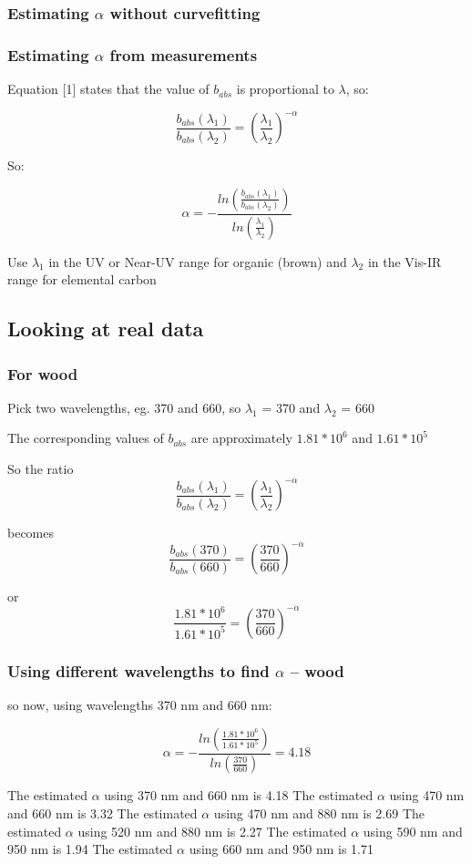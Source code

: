 ﻿\documentclass[ignorenonframetext]{beamer}
\begin{document}
\subsubsection{Estimating \( \alpha \) without curvefitting}

\begin{frame}
\frametitle{Estimating \(\alpha\) from measurements}
    Equation [1] states that the value of \( b_{abs} \) is proportional to \( \lambda \), so:

\[ \frac{b_{abs}(\lambda_1)}{b_{abs}(\lambda_2)} = (\frac{\lambda_1}{\lambda_2})^{-\alpha} \]

So:

\[ \alpha = - \frac{ln(\frac{b_{abs}(\lambda_1)}{b_{abs}(\lambda_2)})}{ln(\frac{\lambda_1}{\lambda_2})}  \]

Use \( \lambda_1 \) in the UV or Near-UV range for organic (brown) and
\( \lambda_2 \) in the Vis-IR range for elemental carbon

\end{frame}

\subsection{Looking at real data}\label{looking-at-real-data}

\begin{frame}
\frametitle{For wood}\label{for-wood}

    Pick two wavelengths, eg. 370 and 660, so \(\lambda_1\) = 370 and
\(\lambda_2\) = 660

The corresponding values of \(b_{abs}\) are approximately \(1.81*10^6\)
and \(1.61*10^5\)

So the ratio
\[ \frac{b_{abs}(\lambda_1)}{b_{abs}(\lambda_2)} = (\frac{\lambda_1}{\lambda_2})^{-\alpha} \]

becomes
\[ \frac{b_{abs}(370)}{b_{abs}(660)} = (\frac{370}{660})^{-\alpha} \]

or
\[ \frac{1.81*10^6}{1.61*10^5} = (\frac{370}{660})^{-\alpha} \]
\end{frame}

\begin{frame}
\frametitle{Using different wavelengths to find \(\alpha\) -- wood}
so now, using wavelengths 370 nm and 660 nm:

\[ \alpha = - \frac{ln(\frac{1.81*10^6}{1.61*10^5})}{ln(\frac{370}{660})} = 4.18 \]

The estimated \(\alpha\) using 370 nm and 660 nm is 4.18\newline
The estimated \(\alpha\) using 470 nm and 660 nm is 3.32\newline
The estimated \(\alpha\) using 470 nm and 880 nm is 2.69\newline
The estimated \(\alpha\) using 520 nm and 880 nm is 2.27\newline
The estimated \(\alpha\) using 590 nm and 950 nm is 1.94\newline
The estimated \(\alpha\) using 660 nm and 950 nm is 1.71\newline
\end{frame}
\end{document}
